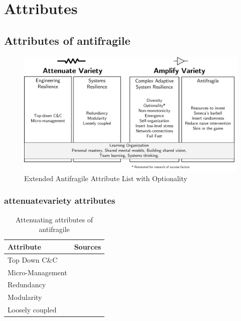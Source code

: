 \chapter{Attributes}
\label{ch:attributes}

\section{Attributes of antifragile}
\label{sec:attributesantifragile}

\begin{figure}[h!]
	\centering
	\includegraphics[width=0.8\linewidth]{images/eaalbwincludingoptionality}
	\caption[Extended Antifragile Attribute List \parencite{Botjes2021} with Optionality]{Extended Antifragile Attribute List \parencite{Botjes2021} with Optionality}
	\label{fig:eaalbwincludingoptionality-attributes}
\end{figure}

\subsection{\Gls{attenuatevariety} attributes}
\begin{table}[H]
	\begin{center}
			\begin{tabular}{@{}ll@{}}
			\toprule
				\textbf{Attribute} & \textbf{Sources} \\%
				\midrule%
				Top Down C\&C & \parencite{Botjes2020} \\%
				Micro-Management & \parencite{Botjes2020} \\%
				Redundancy & \parencite{Botjes2020} \\%
				Modularity & \parencite{Botjes2020} \\%
				Loosely coupled & \parencite{Botjes2020} \\%
			\bottomrule%
			\end{tabular}
			\caption[Attenuating attributes of \gls{antifragile}]{Attenuating attributes of \gls{antifragile}}
			\label{tab:attenuatingattributes}
\end{center}
\end{table}				


